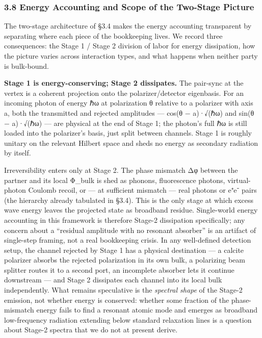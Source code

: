 \documentclass[
]{article}
\begin{document}
\subsubsection{3.8 Energy Accounting and Scope of the Two-Stage
Picture}\label{energy-accounting-and-scope-of-the-two-stage-picture}

The two-stage architecture of §3.4 makes the energy accounting
transparent by separating where each piece of the bookkeeping lives. We
record three consequences: the Stage 1 / Stage 2 division of labor for
energy dissipation, how the picture varies across interaction types, and
what happens when neither party is bulk-bound.

\textbf{Stage 1 is energy-conserving; Stage 2 dissipates.} The pair-sync
at the vertex is a coherent projection onto the polarizer/detector
eigenbasis. For an incoming photon of energy ℏω at polarization θ
relative to a polarizer with axis a, both the transmitted and rejected
amplitudes --- cos(θ − a)·√(ℏω) and sin(θ − a)·√(ℏω) --- are physical at
the end of Stage 1; the photon's full ℏω is still loaded into the
polarizer's basis, just split between channels. Stage 1 is roughly
unitary on the relevant Hilbert space and sheds no energy as secondary
radiation by itself.

Irreversibility enters only at Stage 2. The phase mismatch Δφ between
the partner and its local Φ\_bulk is shed as phonons, fluorescence
photons, virtual-photon Coulomb recoil, or --- at sufficient mismatch
--- real photons or e⁺e⁻ pairs (the hierarchy already tabulated in
§3.4). This is the only stage at which excess wave energy leaves the
projected state as broadband residue. Single-world energy accounting in
this framework is therefore Stage-2 dissipation specifically; any
concern about a ``residual amplitude with no resonant absorber'' is an
artifact of single-step framing, not a real bookkeeping crisis. In any
well-defined detection setup, the channel rejected by Stage 1 has a
physical destination --- a calcite polarizer absorbs the rejected
polarization in its own bulk, a polarizing beam splitter routes it to a
second port, an incomplete absorber lets it continue downstream --- and
Stage 2 dissipates each channel into its local bulk independently. What
remains speculative is the \emph{spectral shape} of the Stage-2
emission, not whether energy is conserved: whether some fraction of the
phase-mismatch energy fails to find a resonant atomic mode and emerges
as broadband low-frequency radiation extending below standard relaxation
lines is a question about Stage-2 spectra that we do not at present
derive.
\end{document}
